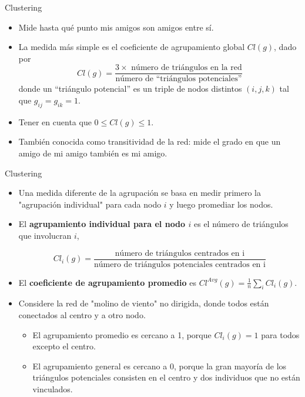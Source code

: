 \documentclass[11pt]{beamer}
\begin{document}
\begin{frame}{Clustering}
    \begin{itemize}
        \item Mide hasta qué punto mis amigos son amigos entre sí.
\item La medida más simple es el coeficiente de agrupamiento global $Cl(g)$, dado por 
\begin{equation*}
Cl (g ) =\frac{ 3 \times \text{ número de triángulos en la red}}{\text{número de “triángulos potenciales”}}
\end{equation*}
 donde un “triángulo potencial” es un triple de nodos distintos $(i, j, k )$ tal que $g_{ij} = g_{ik} = 1$.

     \item Tener en cuenta que $0 \leq Cl (g ) \leq 1$.
\item  También conocida como transitividad de la red: mide el grado en que un amigo de mi amigo también es mi amigo.
    \end{itemize}
\end{frame}


\begin{frame}{Clustering}
\begin{itemize}
 \small   \item Una medida diferente de la agrupación se basa en medir primero la "agrupación individual" para cada nodo $i$ y luego promediar los nodos.
\item El \textbf{agrupamiento individual para el nodo $i$} es el número de triángulos que involucran $i$, 

\begin{equation*}
Cl_i (g )=\frac{ \text{número de triángulos centrados en i}}{\text{número de triángulos potenciales centrados en i}}
\end{equation*}

\item El \textbf{coeficiente de agrupamiento promedio} es $Cl^{Avg} (g ) = \frac{1}{n} \sum_i Cl_i (g ) $.
\item Considere la red de "molino de viento" no dirigida, donde todos están conectados al centro y a otro nodo.
\begin{itemize}
    \item El agrupamiento promedio es cercano a 1, porque $Cl_i (g ) = 1$ para todos excepto el centro.
\item  El agrupamiento general es cercano a 0, porque la gran mayoría de los triángulos potenciales consisten en el centro y dos individuos que no están vinculados.
\end{itemize} 
\end{itemize}
\end{frame}
\end{document}
